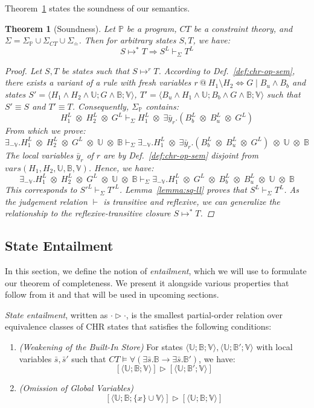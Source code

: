 \documentclass[acmtocl]{acmtrans2m}
\newtheorem{theorem}{Theorem}[section]
\newcommand\state[1]{\langle #1 \rangle}
\newcommand\ent{\rhd}
\newcommand{\bbP}{\ensuremath{\mathbb{P}}}
\newcommand{\B}{\ensuremath{\mathbb{B}}}
\newcommand{\U}{\ensuremath{\mathbb{U}}}
\newcommand{\V}{\ensuremath{\mathbb{V}}}
\newcommand{\Sct}{\ensuremath{\Sigma_{CT}}}
\newcommand{\Seq}{\ensuremath{\Sigma_{\doteq}}}
\newcommand{\Sp}{\ensuremath{\Sigma_\mathbb{P}}}
\newcommand{\by}{\bar{y}}
\newcommand{\bs}{\bar{s}}
\newcommand{\x}{{\;\otimes\;}}
\begin{document}
Theorem~\ref{thm:soundness} states the soundness of our semantics.

\begin{theorem}[Soundness]
  \label{thm:soundness}
  Let $\bbP$ be a program, $CT$ be a constraint theory, and
  $\Sigma=\Sp\cup\Sct\cup\Seq$. Then for arbitrary states $S,T$, we have:
  \[
  	S\mapsto^{*}T \Rightarrow S^L\vdash_\Sigma T^L
  \]
\begin{proof}
Let $S,T$ be states such that $S\mapsto^{r}T$. According to
Def.~\ref{def:chr-op-sem}, there exists a variant of a rule with fresh variables
$r\ @\ H_1\setminus H_2 \Leftrightarrow G\mid B_u \wedge B_b$ and states
$S'=\state{H_1\wedge H_2 \wedge \U; G\wedge\B; \V}$, $T'=\state{B_u \wedge
H_1\wedge \U; B_b\wedge G\wedge\B; \V}$  such that $S'\equiv S$ and $T'\equiv T$.
Consequently, $\Sp$ contains:
\[
  H_1^L\x H_2^L\x G^L \vdash_\Sigma H_1^L\x \exists\by_r.(B_b^L\x B_u^L\x G^L)
\]
From which we prove:
\[
  \exists_{-\V}.H_1^L\x H_2^L\x G^L\x\U\x\B
   \vdash_\Sigma
  \exists_{-\V}.H_1^L \x\exists\by_r.(B_b^L\x B_u^L\x G^L)\x\U\x\B
\]
The local variables $\by_r$ of $r$ are by Def.~\ref{def:chr-op-sem} disjoint
from $vars(H_1,H_2,\U,\B,\V)$. Hence, we have:
\[
  \exists_{-\V}.H_1^L\x H_2^L\x G^L\x\U\x\B
   \vdash_\Sigma
  \exists_{-\V}.H_1^L\x G^L \x B_b^L\x B_u^L\x\U\x\B
\]
This corresponds to $S'^L\vdash_\Sigma T'^L$. Lemma~\ref{lemma:sq-ll} proves that
${S}^L\vdash_\Sigma {T}^L$. As the judgement relation $\vdash$ is transitive and reflexive, we can generalize the relationship
to the reflexive-transitive closure $S\mapsto^{*} T$.
\end{proof}
\end{theorem}

\subsection{State Entailment}
	\label{sec:entailment}

In this section, we define the notion of \emph{entailment}, which we will use to
formulate our theorem of completeness. We present it alongside various properties
that follow from it and that will be used in upcoming sections.

\begin{definition}
\label{def:s_entail}

\emph{State entailment}, written as $\cdot\ent\cdot$, is the smallest
partial-order relation over equivalence classes of CHR states that satisfies the
following conditions:

\begin{enumerate}
	\item \label{cond:sn_wea} \emph{(Weakening of the Built-In Store)} For states $\state{\U;\B;\V},\state{\U;\B';\V}$ with  local variables $\bs,\bs'$ such that
	$CT\models\forall(\exists\bs.\B\rightarrow\exists\bs.\B')$, we have:
	\[
	  [\state{\U;\B;\V}] \ent [\state{\U;\B';\V}]
	\]
	\item \label{cond:sn_omit} \emph{(Omission of Global Variables)}
	\[
	  [\state{\U;\B;\{x\}\cup\V}] \ent [\state{\U;\B;\V}]
	\]

\end{enumerate}
\end{definition}
\end{document}
